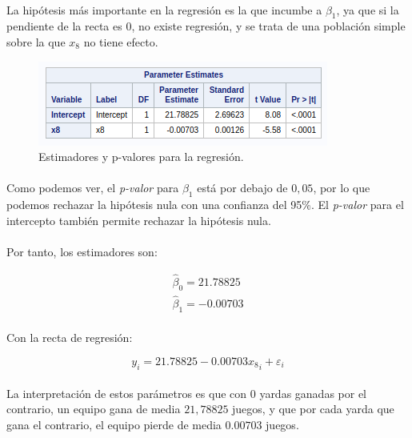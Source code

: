 \documentclass{article}
\begin{document}
  \paragraph{}
  La hipótesis más importante en la regresión es la que incumbe a $\beta_1$, ya que si la pendiente de la recta es 0, no existe regresión, y se trata de una población simple sobre la que $x_8$ no tiene efecto.

  \begin{figure}[H]
    \centering
    \includegraphics[width=.5\textwidth]{img/montgomery/procreg.png}
    \caption{Estimadores y p-valores para la regresión.}
    \label{img:mont-procreg}
  \end{figure}

  \paragraph{}
  Como podemos ver, el \textit{p-valor} para $\beta_1$ está por debajo de $0,05$, por lo que podemos rechazar la hipótesis nula con una confianza del 95\%. El \textit{p-valor} para el intercepto también permite rechazar la hipótesis nula.

  \paragraph{}
  Por tanto, los estimadores son:

  \begin{align}
    \hat\beta_0 = 21.78825\\
    \hat\beta_1 = -0.00703
  \end{align}

  \paragraph{}
  Con la recta de regresión:

  \begin{equation}
    y_i = 21.78825 -0.00703{x_8}_i + \varepsilon_i
  \end{equation}

  \paragraph{}
  La interpretación de estos parámetros es que con 0 yardas ganadas por el contrario, un equipo gana de media $21,78825$ juegos, y que por cada yarda que gana el contrario, el equipo pierde de media $0.00703$ juegos.
\end{document}

